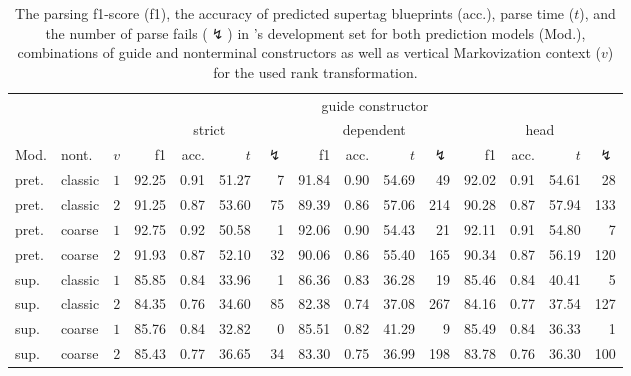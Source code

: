 \documentclass[../../document.tex]{subfiles}
\begin{document}
    \begin{table}
        \caption{\label{tbl:experiments:tiger}
        The parsing f1-score (f1), the accuracy of predicted supertag blueprints (acc.), parse time ($t$), and the number of parse fails ($\lightning$) in \tiger{}'s development set for both prediction models (Mod.), combinations of guide and nonterminal constructors as well as vertical Markovization context ($v$) for the used rank transformation.
        }
        \centering
        \setlength{\tabcolsep}{4pt}
        \vspace{.2cm}
        \begin{tabular}{llc|rrrr|rrrr|rrrr}
            \toprule
            &&& \multicolumn{12}{c}{guide constructor}\\
         &    &        & \multicolumn{4}{c|}{strict} & \multicolumn{4}{c|}{dependent} & \multicolumn{4}{c}{head}  \\
    Mod. & nont.   &\(v\)   & f1 & acc. & $t$ & $\lightning$ & f1 & acc. & $t$ & $\lightning$ & f1 & acc. & $t$ & $\lightning$ \\ \hline
    pret. & classic & \(1\)  & 92.25 & 0.91 & 51.27 & 7 & 91.84 & 0.90 & 54.69 & 49 & 92.02 & 0.91 & 54.61 & 28 \\
    pret. & classic & \(2\)  & 91.25 & 0.87 & 53.60 & 75 & 89.39 & 0.86 & 57.06 & 214 & 90.28 & 0.87 & 57.94 & 133 \\
    pret. & coarse  & \(1\)  & 92.75 & 0.92 & 50.58 & 1 & 92.06 & 0.90 & 54.43 & 21 & 92.11 & 0.91 & 54.80 & 7 \\
    pret. & coarse  & \(2\)  & 91.93 & 0.87 & 52.10 & 32 & 90.06 & 0.86 & 55.40 & 165 & 90.34 & 0.87 & 56.19 & 120 \\
    \midrule
    sup. & classic & \(1\)  & 85.85 & 0.84 & 33.96 & 1 & 86.36 & 0.83 & 36.28 & 19 & 85.46 & 0.84 & 40.41 & 5 \\
    sup. & classic & \(2\)  & 84.35 & 0.76 & 34.60 & 85 & 82.38 & 0.74 & 37.08 & 267 & 84.16 & 0.77 & 37.54 & 127 \\
    sup. & coarse  & \(1\)  & 85.76 & 0.84 & 32.82 & 0 & 85.51 & 0.82 & 41.29 & 9 & 85.49 & 0.84 & 36.33 & 1 \\
    sup. & coarse  & \(2\)  & 85.43 & 0.77 & 36.65 & 34 & 83.30 & 0.75 & 36.99 & 198 & 83.78 & 0.76 & 36.30 & 100 \\
    \bottomrule
        \end{tabular}
    \end{table}
\end{document}
